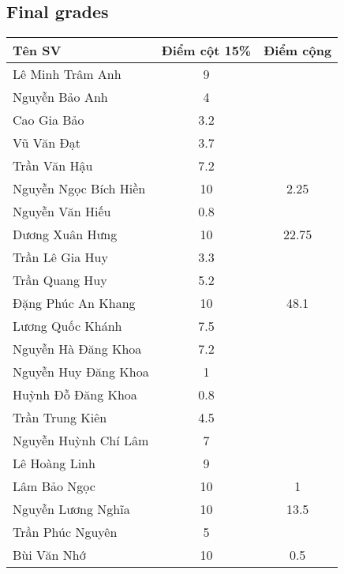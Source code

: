 \documentclass{article}
\begin{document}

\subsection{Final grades}

\begin{table}[H]
    \centering
    \begin{tabular}{|l|c|c|}
        \hline
        {\bf Tên SV} & {\bf Điểm cột 15\%} & {\bf Điểm cộng} \\
        \hline
        Lê Minh Trâm Anh & 9 &  \\
        \hline
        Nguyễn Bảo Anh & 4 &  \\
        \hline
        Cao Gia Bảo & 3.2 &  \\
        \hline
        Vũ Văn Đạt & 3.7 &  \\
        \hline
        Trần Văn Hậu & 7.2 &  \\
        \hline
        Nguyễn Ngọc Bích Hiền & 10 & 2.25 \\
        \hline
        Nguyễn Văn Hiếu & 0.8 &  \\
        \hline
        Dương Xuân Hưng & 10 & 22.75 \\
        \hline
        Trần Lê Gia Huy & 3.3 &  \\
        \hline
        Trần Quang Huy & 5.2 &  \\
        \hline
        Đặng Phúc An Khang & 10 & 48.1 \\
        \hline
        Lương Quốc Khánh & 7.5 &  \\
        \hline
        Nguyễn Hà Đăng Khoa & 7.2 &  \\
        \hline
        Nguyễn Huy Đăng Khoa & 1 &  \\
        \hline
        Huỳnh Đỗ Đăng Khoa & 0.8 &  \\
        \hline
        Trần Trung Kiên & 4.5 &  \\
        \hline
        Nguyễn Huỳnh Chí Lâm & 7 &  \\
        \hline
        Lê Hoàng Linh & 9 &  \\
        \hline
        Lâm Bảo Ngọc & 10 & 1 \\
        \hline
        Nguyễn Lương Nghĩa & 10 & 13.5 \\
        \hline
        Trần Phúc Nguyên & 5 &  \\
        \hline
        Bùi Văn Nhớ & 10 & 0.5 \\

\end{tabular}
\end{table}
\end{document}
